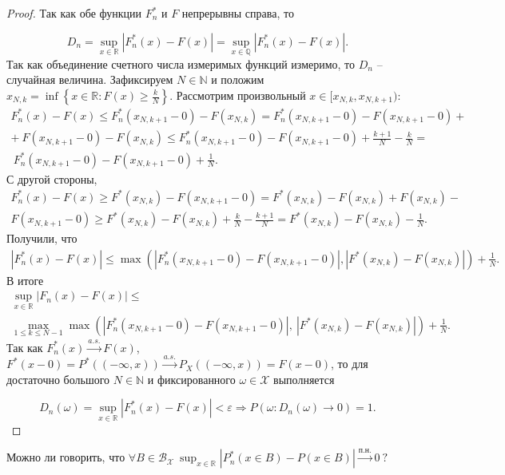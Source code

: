 \begin{proof}
    Так как обе функции $\displaystyle F_{n}^{*}$ и $\displaystyle F$ непрерывны справа, то
    
    
    \begin{equation*}
    	D_{n} =\sup _{x\in \mathbb{R}}\left| F_{n}^{*}( x) -F( x)\right| =\sup _{x\in \mathbb{Q}}\left| F_{n}^{*}( x) -F( x)\right| .
    \end{equation*}
    Так как объединение счетного числа измеримых функций измеримо, то $\displaystyle D_{n}$ -- случайная величина. Зафиксируем $\displaystyle N\in \mathbb{N}$ и положим $\displaystyle x_{N,k} =\inf\left\{x\in \mathbb{R} :F( x) \geqslant \frac{k}{N}\right\}$. Рассмотрим произвольный $\displaystyle x\in [ x_{N,k} ,x_{N,k+1})$:
    \begin{gather*}
    F_{n}^{*}( x) -F( x) \leqslant F_{n}^{*}( x_{N,k+1} -0) -F( x_{N,k}) =F_{n}^{*}( x_{N,k+1} -0) -F( x_{N,k+1} -0) +\\
    +\ F( x_{N,k+1} -0) -F( x_{N,k}) \leqslant F_{n}^{*}( x_{N,k+1} -0) -F( x_{N,k+1} -0) +\frac{k+1}{N} -\frac{k}{N} =\\
    \ F_{n}^{*}( x_{N,k+1} -0) -F( x_{N,k+1} -0) +\frac{1}{N} .
    \end{gather*}
    С другой стороны,
    \begin{gather*}
    F_{n}^{*}( x) -F( x) \geqslant F^{*}( x_{N,k}) -F( x_{N,k+1} -0) =F^{*}( x_{N,k}) -F( x_{N,k}) +F( x_{N,k}) -\\
    F( x_{N,k+1} -0) \geqslant F^{*}( x_{N,k}) -F( x_{N,k}) +\frac{k}{N} -\frac{k+1}{N} =F^{*}( x_{N,k}) -F( x_{N,k}) -\frac{1}{N} .
    \end{gather*}
    Получили, что
    \begin{gather*}
    \left| F_{n}^{*}( x) -F( x)\right| \leqslant \max\left(\left| F_{n}^{*}( x_{N,k+1} -0) -F( x_{N,k+1} -0)\right| ,\left| F^{*}( x_{N,k}) -F( x_{N,k})\right| \right) + \frac{1}{N}.
    \end{gather*}
    В итоге
    \begin{gather*}
    \sup _{x\in \mathbb{R}}| F_{n}( x) -F( x)| \leqslant\\ \max_{1\leqslant k\leqslant N-1}\max\left(\left| F_{n}^{*}( x_{N,k+1} -0) -F( x_{N,k+1} -0)\right|,\ \left| F^{*}( x_{N,k}) -F( x_{N,k})\right| \right)+\frac{1}{N} .
    \end{gather*}
    Так как $\displaystyle F_{n}^{*}( x)\xrightarrow{a.s.} F( x)$, $\displaystyle F^{*}( x-0) =P^{*}(( -\infty ,x))\xrightarrow{a.s.} P_{X}(( -\infty ,x)) =F( x-0)$, то для достаточно большого $\displaystyle N\in \mathbb{N}$ и фиксированного $\displaystyle \omega \in \mathcal{X}$ выполняется
    
    \begin{equation*}
    D_{n}( \omega ) =\sup _{x\in \mathbb{R}}\left| F_{n}^{*}( x) -F( x)\right| < \varepsilon \Rightarrow P\left( \omega :D_{n}( \omega )\rightarrow 0\right) =1.
    \end{equation*}
\end{proof}

\begin{exercise}
Можно ли говорить, что $\displaystyle \forall B\in \mathcal{B}_{\mathcal{X}} \ \sup _{x\in \mathbb{R}}\left| P_{n}^{*}( x\in B) -P( x\in B)\right| \xrightarrow{п.н.} 0\ ?$
\end{exercise}